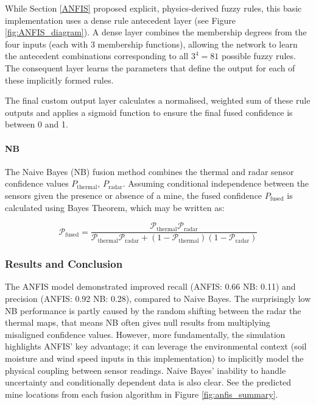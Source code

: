     While Section \ref{ANFIS} proposed explicit, physics-derived fuzzy rules, this basic implementation uses a dense rule antecedent layer (see Figure \ref{fig:ANFIS_diagram}). A dense layer combines the membership degrees from the four inputs (each with 3 membership functions), allowing the network to learn the antecedent combinations corresponding to all $3^4=81$ possible fuzzy rules. The consequent layer learns the parameters that define the output for each of these implicitly formed rules. 
    
    The final custom output layer calculates a normalised, weighted sum of these rule outputs and applies a sigmoid function to ensure the final fused confidence is between 0 and 1.

    \paragraph{NB} The Naive Bayes (NB) fusion method combines the thermal and radar sensor confidence values $P_{\text{thermal}}$, $P_{\text{radar}}$. Assuming conditional independence between the sensors given the presence or absence of a mine, the fused confidence $P_{\text{fused}}$ is calculated using Bayes Theorem, which may be written as:

    \begin{equation}
        \label{eq:bayes_fusion}
        \mathcal{P}_\text{fused} = \frac{\mathcal{P}_\text{thermal}\mathcal{P}_\text{radar}}{\mathcal{P}_\text{thermal}\mathcal{P}_\text{radar} + (1-\mathcal{P}_\text{thermal})(1-\mathcal{P}_\text{radar})}
    \end{equation}
    
\subsubsection{Results and Conclusion}  

    The ANFIS model demonstrated improved recall (ANFIS: 0.66 NB: 0.11) and precision (ANFIS: 0.92 NB: 0.28), compared to Naive Bayes. The surprisingly low NB performance is partly caused by the random shifting between the radar the thermal maps, that means NB often gives null results from multiplying misaligned confidence values. However, more fundamentally, the simulation highlights ANFIS' key advantage; it can leverage the environmental context (soil moisture and wind speed inputs in this implementation) to implicitly model the physical coupling between sensor readings. Naive Bayes' inability to handle uncertainty and conditionally dependent data is also clear. See the predicted mine locations from each fusion algorithm in Figure \ref{fig:anfis_summary}.

